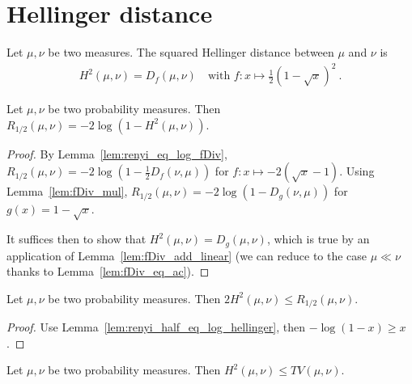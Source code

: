 \chapter{Hellinger distance}

\begin{definition}
  \label{def:Hellinger}
  \leanok
  Let $\mu, \nu$ be two measures. The squared Hellinger distance between $\mu$ and $\nu$ is
  \begin{align*}
    H^2(\mu, \nu) = D_f(\mu, \nu) \quad \text{with } f: x \mapsto \frac{1}{2}\left( 1 - \sqrt{x} \right)^2 \: .
  \end{align*}
\end{definition}

\begin{lemma}
  \label{lem:renyi_half_eq_log_hellinger}
  Let $\mu, \nu$ be two probability measures. Then $R_{1/2}(\mu, \nu) = -2\log(1 - H^2(\mu, \nu))$.
\end{lemma}

\begin{proof}
By Lemma~\ref{lem:renyi_eq_log_fDiv}, $R_{1/2}(\mu, \nu) = -2 \log (1 - \frac{1}{2} D_f(\nu, \mu))$ for $f : x \mapsto -2 (\sqrt{x} - 1)$. Using Lemma~\ref{lem:fDiv_mul}, $R_{1/2}(\mu, \nu) = -2 \log (1 - D_g(\nu, \mu))$ for $g(x) = 1 - \sqrt{x}$.

It suffices then to show that $H^2(\mu, \nu) = D_g(\mu, \nu)$, which is true by an application of Lemma~\ref{lem:fDiv_add_linear} (we can reduce to the case $\mu \ll \nu$ thanks to Lemma~\ref{lem:fDiv_eq_ac}).
\end{proof}

\begin{lemma}
  \label{lem:hellinger_le_renyi}
  Let $\mu, \nu$ be two probability measures. Then $2 H^2(\mu, \nu) \le R_{1/2}(\mu, \nu)$.
\end{lemma}

\begin{proof}
Use Lemma~\ref{lem:renyi_half_eq_log_hellinger}, then $-\log(1 - x) \ge x$.
\end{proof}

\begin{lemma}
  \label{lem:hellinger_le_tv}
  Let $\mu, \nu$ be two probability measures. Then $H^2(\mu, \nu) \le TV(\mu, \nu)$.
\end{lemma}

